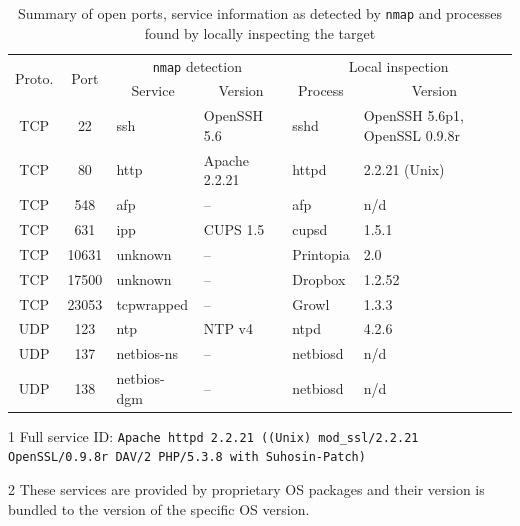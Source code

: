 \documentclass[10pt,a4paper,twoside,onecolumn]{article}
\begin{document}
\begin{table}
\begin{threeparttable}[b]
\begin{tabularx}{\textwidth}{ c c | l l | l X }

\toprule

\multirow{2}{*}{Proto.} &
\multirow{2}{*}{Port} &
\multicolumn{2}{c|}{\texttt{nmap} detection} &
\multicolumn{2}{c}{Local inspection} \\
\cline{3-6} & &
\multicolumn{1}{c}{Service} &
\multicolumn{1}{c|}{Version} &
\multicolumn{1}{c}{Process} &
\multicolumn{1}{c}{Version} \\
\hline

TCP & 22 & ssh & OpenSSH 5.6 & sshd & OpenSSH 5.6p1, OpenSSL 0.9.8r \\
TCP & 80 & http & Apache 2.2.21\tnote{1} & httpd & 2.2.21 (Unix) \\
TCP & 548 & afp & -- & afp & n/d\tnote{2} \\
TCP & 631 & ipp & CUPS 1.5 & cupsd & 1.5.1 \\
TCP & 10631 & unknown & -- & Printopia & 2.0  \\
TCP & 17500 & unknown & -- & Dropbox & 1.2.52 \\
TCP & 23053 & tcpwrapped & -- & Growl & 1.3.3 \\
UDP & 123 & ntp & NTP v4 & ntpd & 4.2.6 \\
UDP & 137 & netbios-ns & -- & netbiosd & n/d\tnote{2} \\
UDP & 138 & netbios-dgm & -- & netbiosd & n/d\tnote{2} \\

\bottomrule
\end{tabularx}

\begin{tablenotes}
	\item[1] Full service ID: \texttt{Apache httpd 2.2.21 ((Unix) mod\_ssl/2.2.21 OpenSSL/0.9.8r DAV/2 PHP/5.3.8 with Suhosin-Patch)}
	\item[2] These services are provided by proprietary OS packages and their version is bundled to the version of the specific OS version.
\end{tablenotes}

\caption{Summary of open ports, service information as detected by \texttt{nmap} and processes found by locally inspecting the target}
\label{tab:report}
\end{threeparttable}
\end{table}
\end{document}
